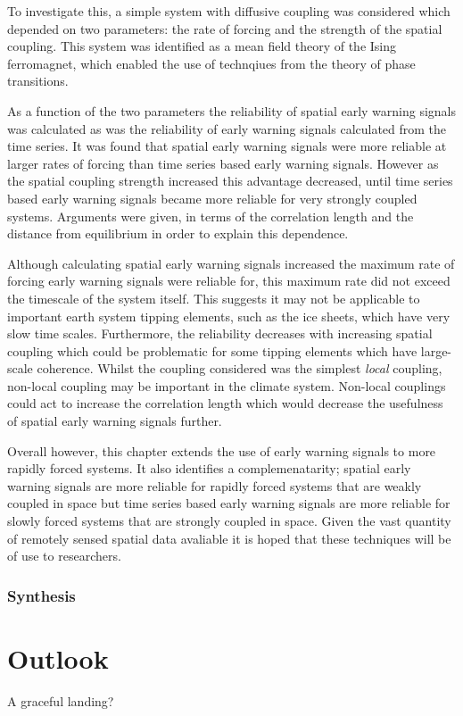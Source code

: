 To investigate this, a simple system with diffusive coupling was considered which depended on two parameters: the rate of forcing and the strength of the spatial coupling.
This system was identified as a mean field theory of the Ising ferromagnet, which enabled the use of technqiues from the theory of phase transitions.

As a function of the two parameters the reliability of spatial early warning signals was calculated as was the reliability of early warning signals calculated from the time series.
It was found that spatial early warning signals were more reliable at larger rates of forcing than time series based early warning signals. However as the spatial coupling
strength increased this advantage decreased, until time series based early warning signals became more reliable for very strongly coupled systems. Arguments were given, in terms of the correlation
length and the distance from equilibrium in order to explain this dependence.

Although calculating spatial early warning signals increased the maximum rate of forcing early warning signals were reliable for, this maximum rate did not exceed the timescale of the system
itself. This suggests it may not be applicable to important earth system tipping elements, such as the ice sheets, which have very slow time scales. Furthermore, the reliability decreases with
increasing spatial coupling which could be problematic for some tipping elements which have large-scale coherence. Whilst the coupling considered was the simplest \emph{local} coupling, non-local
coupling may be important in the climate system. Non-local couplings could act to increase the correlation length which would decrease the usefulness of spatial early warning signals further.

Overall however, this chapter extends the use of early warning signals to more rapidly forced systems. It also identifies a complemenatarity; spatial early warning signals are more reliable
for rapidly forced systems that are weakly coupled in space but time series based early warning signals are more reliable for slowly forced systems that are strongly coupled in space.
Given the vast quantity of remotely sensed spatial data avaliable \parencite{Campbell2011} it is hoped that these techniques will be of use to researchers.

\subsubsection{}

\subsubsection{Synthesis}

\section{Outlook}

A graceful landing?